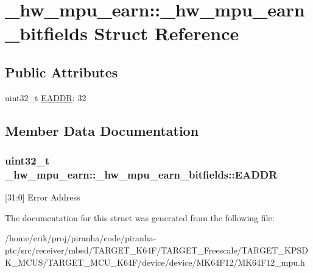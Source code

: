 \hypertarget{struct__hw__mpu__earn_1_1__hw__mpu__earn__bitfields}{}\section{\+\_\+hw\+\_\+mpu\+\_\+earn\+:\+:\+\_\+hw\+\_\+mpu\+\_\+earn\+\_\+bitfields Struct Reference}
\label{struct__hw__mpu__earn_1_1__hw__mpu__earn__bitfields}
\subsection*{Public Attributes}
\begin{DoxyCompactItemize}
\item 
uint32\+\_\+t \hyperlink{struct__hw__mpu__earn_1_1__hw__mpu__earn__bitfields_ae8a401b97c74b56c2afa1d9b192bcf2e}{E\+A\+D\+DR}\+: 32
\end{DoxyCompactItemize}


\subsection{Member Data Documentation}
\subsubsection[{\texorpdfstring{E\+A\+D\+DR}{EADDR}}]{\setlength{\rightskip}{0pt plus 5cm}uint32\+\_\+t \+\_\+hw\+\_\+mpu\+\_\+earn\+::\+\_\+hw\+\_\+mpu\+\_\+earn\+\_\+bitfields\+::\+E\+A\+D\+DR}\hypertarget{struct__hw__mpu__earn_1_1__hw__mpu__earn__bitfields_ae8a401b97c74b56c2afa1d9b192bcf2e}{}\label{struct__hw__mpu__earn_1_1__hw__mpu__earn__bitfields_ae8a401b97c74b56c2afa1d9b192bcf2e}
\mbox{[}31\+:0\mbox{]} Error Address 

The documentation for this struct was generated from the following file\+:\begin{DoxyCompactItemize}
\item 
/home/erik/proj/piranha/code/piranha-\/ptc/src/receiver/mbed/\+T\+A\+R\+G\+E\+T\+\_\+\+K64\+F/\+T\+A\+R\+G\+E\+T\+\_\+\+Freescale/\+T\+A\+R\+G\+E\+T\+\_\+\+K\+P\+S\+D\+K\+\_\+\+M\+C\+U\+S/\+T\+A\+R\+G\+E\+T\+\_\+\+M\+C\+U\+\_\+\+K64\+F/device/device/\+M\+K64\+F12/M\+K64\+F12\+\_\+mpu.\+h\end{DoxyCompactItemize}
